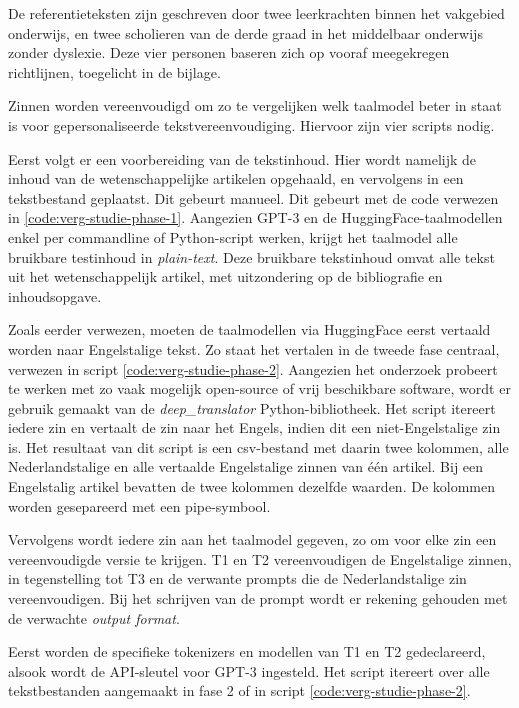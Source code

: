 \medspace 

De referentieteksten zijn geschreven door twee leerkrachten binnen het vakgebied onderwijs, en twee scholieren van de derde graad in het middelbaar onderwijs zonder dyslexie. Deze vier personen baseren zich op vooraf meegekregen richtlijnen, toegelicht in de bijlage. 

\medspace

Zinnen worden vereenvoudigd om zo te vergelijken welk taalmodel beter in staat is voor gepersonaliseerde tekstvereenvoudiging. Hiervoor zijn vier scripts nodig.

\medspace

Eerst volgt er een voorbereiding van de tekstinhoud. Hier wordt namelijk de inhoud van de wetenschappelijke artikelen opgehaald, en vervolgens in een tekstbestand geplaatst. Dit gebeurt manueel. Dit gebeurt met de code verwezen in \ref{code:verg-studie-phase-1}. Aangezien GPT-3 en de HuggingFace-taalmodellen enkel per commandline of Python-script werken, krijgt het taalmodel alle bruikbare testinhoud in \textit{plain-text}. Deze bruikbare tekstinhoud omvat alle tekst uit het wetenschappelijk artikel, met uitzondering op de bibliografie en inhoudsopgave.


Zoals eerder verwezen, moeten de taalmodellen via HuggingFace eerst vertaald worden naar Engelstalige tekst. Zo staat het vertalen in de tweede fase centraal, verwezen in script \ref{code:verg-studie-phase-2}. Aangezien het onderzoek probeert te werken met zo vaak mogelijk open-source of vrij beschikbare software, wordt er gebruik gemaakt van de \textit{deep\_translator} Python-bibliotheek. Het script itereert iedere zin en vertaalt de zin naar het Engels, indien dit een niet-Engelstalige zin is. Het resultaat van dit script is een csv-bestand met daarin twee kolommen, alle Nederlandstalige en alle vertaalde Engelstalige zinnen van één artikel. Bij een Engelstalig artikel bevatten de twee kolommen dezelfde waarden. De kolommen worden gesepareerd met een pipe-symbool.

\medspace

Vervolgens wordt iedere zin aan het taalmodel gegeven, zo om voor elke zin een vereenvoudigde versie te krijgen. T1 en T2 vereenvoudigen de Engelstalige zinnen, in tegenstelling tot T3 en de verwante prompts die de Nederlandstalige zin vereenvoudigen. Bij het schrijven van de prompt wordt er rekening gehouden met de verwachte \textit{output format}. 

Eerst worden de specifieke tokenizers en modellen van T1 en T2 gedeclareerd, alsook wordt de API-sleutel voor GPT-3 ingesteld. Het script itereert over alle tekstbestanden aangemaakt in fase 2 of in script \ref{code:verg-studie-phase-2}.


